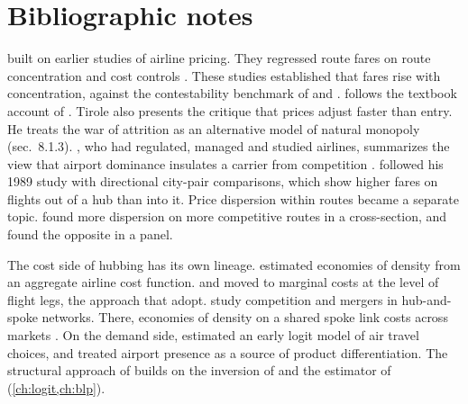 





\section{Bibliographic notes}\label{sec:09-bibnotes}

\citet{Borenstein1989} built on earlier studies of airline pricing. They regressed route fares on route
concentration and cost controls \citep{GrahamKaplanSibley1983,BaileyGrahamKaplan1985,CallKeeler1985,MorrisonWinston1987}. These studies established that fares rise with concentration, against the
contestability benchmark of \citet{BaumolPanzarWillig1982} and \citet{Baumol1982}. 
follows the textbook account of \citet[sec.~8.1]{Tirole1988}. Tirole also presents the critique that prices
adjust faster than entry. He treats the war of attrition as an alternative model of natural monopoly
(sec.~8.1.3). \citet{Levine1987}, who
had regulated, managed and studied airlines, summarizes the view that airport dominance insulates a carrier
from competition \citep[p.~345, n.~3]{Borenstein1989}. \citet{Borenstein1991}
followed his 1989 study with directional city-pair comparisons, which show higher fares on flights out of a
hub than into it. Price dispersion within routes became a separate topic. \citet{BorensteinRose1994} found
more dispersion on more competitive routes in a cross-section, and \citet{GerardiShapiro2009} found the
opposite in a panel.

The cost side of hubbing has its own lineage. \citet{CavesChristensenTretheway1984} estimated economies of
density from an aggregate airline cost function. \citet{BruecknerDyerSpiller1992} and
\citet{BruecknerSpiller1994} moved to marginal costs at the level of flight legs, the approach that
\citet{BerryCarnallSpiller2006} adopt. \citet{BruecknerSpiller1991} study competition and mergers in
hub-and-spoke networks. There, economies of density on a shared spoke link costs across markets
\citep[p.~2, n.~5]{BerryCarnallSpiller1996}. On the demand side,
\citet{MorrisonWinston1986} estimated an early logit model of air travel choices, and \citet{Berry1990}
treated airport presence as a source of product differentiation. The structural approach of
\citet{BerryCarnallSpiller2006} builds on the inversion of \citet{Berry1994} and the estimator of
\citet{BerryLevinsohnPakes1995} (\cref{ch:logit,ch:blp}).

